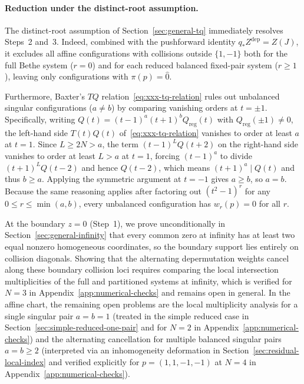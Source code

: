 \documentclass[11pt]{article}
\theoremstyle{definition}
\begin{document}
\paragraph{Reduction under the distinct-root assumption.}
The distinct-root assumption of Section~\ref{sec:general-tq} immediately resolves Steps~2 and~3.
Indeed, combined with the pushforward identity $q_*Z^{\mathrm{dep}}=Z(J)$, it excludes
all affine configurations with collisions outside $\{1,-1\}$ both for the
full Bethe system ($r=0$) and for each reduced balanced fixed-pair system ($r\ge 1$), leaving only configurations with $\pi(p)=\hat{0}$.

Furthermore, Baxter's $TQ$ relation~\eqref{eq:xxx-tq-relation} rules out unbalanced singular configurations ($a\ne b$) by comparing vanishing orders at $t=\pm 1$. Specifically, writing $Q(t)=(t-1)^a(t+1)^b Q_{\mathrm{reg}}(t)$ with $Q_{\mathrm{reg}}(\pm 1)\ne 0$, the left-hand side $T(t)Q(t)$ of~\eqref{eq:xxx-tq-relation} vanishes to order at least $a$ at $t=1$. Since $L\ge 2N>a$, the term $(t-1)^L Q(t+2)$ on the right-hand side vanishes to order at least $L>a$ at $t=1$, forcing $(t-1)^a$ to divide $(t+1)^L Q(t-2)$ and hence $Q(t-2)$, which means $(t+1)^a\mid Q(t)$ and thus $b\ge a$. Applying the symmetric argument at $t=-1$ gives $a\ge b$, so $a=b$. Because the same reasoning applies after factoring out $(t^2-1)^r$ for any $0\le r\le\min(a,b)$, every unbalanced configuration has $w_r(p)=0$ for all $r$.

At the boundary $z=0$ (Step~1), we prove unconditionally in Section~\ref{sec:general-infinity} that
every common zero at infinity has at least two equal nonzero homogeneous coordinates, so the boundary support lies entirely on collision diagonals. Showing that the alternating depermutation weights cancel along these boundary collision loci requires comparing the local intersection multiplicities of the full and partitioned systems at infinity, which is verified for $N=3$ in Appendix~\ref{app:numerical-checks} and remains open in general.
In the affine chart, the remaining open problems are the local multiplicity analysis for a single singular pair $a=b=1$ (treated in the simple reduced case in Section~\ref{sec:simple-reduced-one-pair} and for $N=2$ in Appendix~\ref{app:numerical-checks}) and the alternating cancellation for multiple balanced singular pairs $a=b\ge 2$ (interpreted via an inhomogeneity deformation in Section~\ref{sec:residual-local-index} and verified explicitly for $p=(1,1,-1,-1)$ at $N=4$ in Appendix~\ref{app:numerical-checks}).
\end{document}
